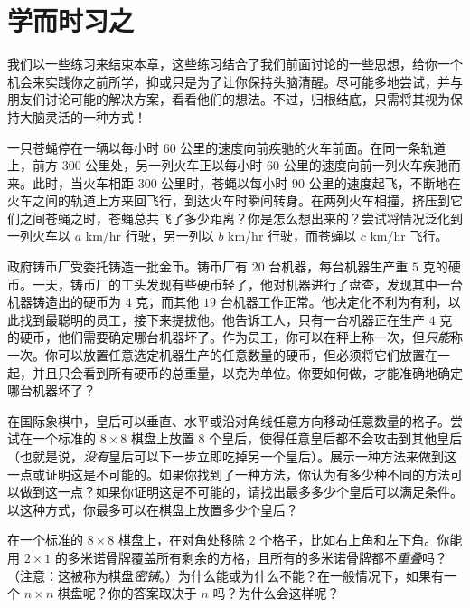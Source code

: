 \section{学而时习之}\label{sec:section1.5}

我们以一些练习来结束本章，这些练习结合了我们前面讨论的一些思想，给你一个机会来实践你之前所学，抑或只是为了让你保持头脑清醒。尽可能多地尝试，并与朋友们讨论可能的解决方案，看看他们的想法。不过，归根结底，只需将其视为保持大脑灵活的一种方式！

\begin{exercise}
    一只苍蝇停在一辆以每小时 $60$ 公里的速度向前疾驰的火车前面。在同一条轨道上，前方 $300$ 公里处，另一列火车正以每小时 $60$ 公里的速度向前一列火车疾驰而来。此时，当火车相距 $300$ 公里时，苍蝇以每小时 $90$ 公里的速度起飞，不断地在火车之间的轨道上方来回飞行，到达火车时瞬间转身。在两列火车相撞，挤压到它们之间苍蝇之时，苍蝇总共飞了多少距离？你是怎么想出来的？尝试将情况泛化到一列火车以 $a$ km/hr 行驶，另一列以 $b$ km/hr 行驶，而苍蝇以 $c$ km/hr 飞行。
\end{exercise}

\begin{exercise}
    政府铸币厂受委托铸造一批金币。铸币厂有 $20$ 台机器，每台机器生产重 $5$ 克的硬币。一天，铸币厂的工头发现有些硬币轻了，他对机器进行了盘查，发现其中一台机器铸造出的硬币为 $4$ 克，而其他 $19$ 台机器工作正常。他决定化不利为有利，以此找到最聪明的员工，接下来提拔他。他告诉工人，只有一台机器正在生产 $4$ 克的硬币，他们需要确定哪台机器坏了。作为员工，你可以在秤上称一次，但\textit{只能}称一次。你可以放置任意选定机器生产的任意数量的硬币，但必须将它们放置在一起，并且只会看到所有硬币的总重量，以克为单位。你要如何做，才能准确地确定哪台机器坏了？
\end{exercise}

\begin{exercise}
    在国际象棋中，皇后可以垂直、水平或沿对角线任意方向移动任意数量的格子。尝试在一个标准的 $8 \times 8$ 棋盘上放置 $8$ 个皇后，使得任意皇后都不会攻击到其他皇后（也就是说，\textit{没有}皇后可以下一步立即吃掉另一个皇后）。展示一种方法来做到这一点或证明这是不可能的。如果你找到了一种方法，你认为有多少种不同的方法可以做到这一点？如果你证明这是不可能的，请找出最多多少个皇后可以满足条件。以这种方式，你最多可以在棋盘上放置多少个皇后？
\end{exercise}

\begin{exercise}
    在一个标准的 $8 \times 8$ 棋盘上，在对角处移除 $2$ 个格子，比如右上角和左下角。你能用 $2 \times 1$ 的多米诺骨牌覆盖所有剩余的方格，且所有的多米诺骨牌都不\textit{重叠}吗？（注意：这被称为棋盘\textit{密铺}。）为什么能或为什么不能？在一般情况下，如果有一个 $n \times n$ 棋盘呢？你的答案取决于 $n$ 吗？为什么会这样呢？
\end{exercise}

